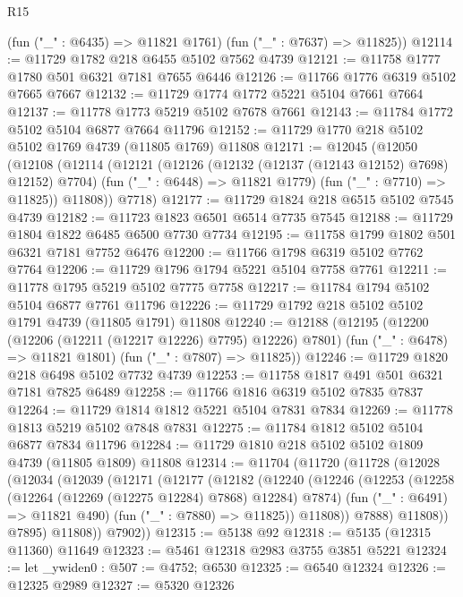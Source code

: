 \begin{lexlean}{R15}
\begin{coremodule}
{{{{{{{{{{{      (fun ("_" : @6435) => @11821 @1761)
      (fun ("_" : @7637) => @11825))
@12114 := @11729 @1782 @218 @6455 @5102 @7562 @4739
@12121 := @11758 @1777 @1780 @501 @6321 @7181 @7655 @6446
@12126 := @11766 @1776 @6319 @5102 @7665 @7667
@12132 := @11729 @1774 @1772 @5221 @5104 @7661 @7664
@12137 := @11778 @1773 @5219 @5102 @7678 @7661
@12143 := @11784 @1772 @5102 @5104 @6877 @7664 @11796
@12152 := @11729 @1770 @218 @5102 @5102 @1769 @4739 (@11805 @1769) @11808
@12171 := @12045
    (@12050
      (@12108
        (@12114
          (@12121
            (@12126 (@12132 (@12137 (@12143 @12152) @7698) @12152) @7704)
            (fun ("_" : @6448) => @11821 @1779)
            (fun ("_" : @7710) => @11825))
          @11808))
      @7718)
@12177 := @11729 @1824 @218 @6515 @5102 @7545 @4739
@12182 := @11723 @1823 @6501 @6514 @7735 @7545
@12188 := @11729 @1804 @1822 @6485 @6500 @7730 @7734
@12195 := @11758 @1799 @1802 @501 @6321 @7181 @7752 @6476
@12200 := @11766 @1798 @6319 @5102 @7762 @7764
@12206 := @11729 @1796 @1794 @5221 @5104 @7758 @7761
@12211 := @11778 @1795 @5219 @5102 @7775 @7758
@12217 := @11784 @1794 @5102 @5104 @6877 @7761 @11796
@12226 := @11729 @1792 @218 @5102 @5102 @1791 @4739 (@11805 @1791) @11808
@12240 := @12188
    (@12195
      (@12200 (@12206 (@12211 (@12217 @12226) @7795) @12226) @7801)
      (fun ("_" : @6478) => @11821 @1801)
      (fun ("_" : @7807) => @11825))
@12246 := @11729 @1820 @218 @6498 @5102 @7732 @4739
@12253 := @11758 @1817 @491 @501 @6321 @7181 @7825 @6489
@12258 := @11766 @1816 @6319 @5102 @7835 @7837
@12264 := @11729 @1814 @1812 @5221 @5104 @7831 @7834
@12269 := @11778 @1813 @5219 @5102 @7848 @7831
@12275 := @11784 @1812 @5102 @5104 @6877 @7834 @11796
@12284 := @11729 @1810 @218 @5102 @5102 @1809 @4739 (@11805 @1809) @11808
@12314 := @11704
    (@11720
      (@11728
        (@12028
          (@12034
            (@12039
              (@12171
                (@12177
                  (@12182
                    (@12240
                      (@12246
                        (@12253
                          (@12258 (@12264 (@12269 (@12275 @12284) @7868) @12284) @7874)
                          (fun ("_" : @6491) => @11821 @490)
                          (fun ("_" : @7880) => @11825))
                        @11808))
                    @7888)
                  @11808))
              @7895)
            @11808))
        @7902))
@12315 := @5138 @92
@12318 := @5135 (@12315 @11360) @11649
@12323 := @5461 @12318 @2983 @3755 @3851 @5221
@12324 := let _ywiden0 : @507 := @4752; @6530
@12325 := @6540 @12324
@12326 := @12325 @2989
@12327 := @5320 @12326
}}}}}}}}}}}
\end{coremodule}
\end{lexlean}
